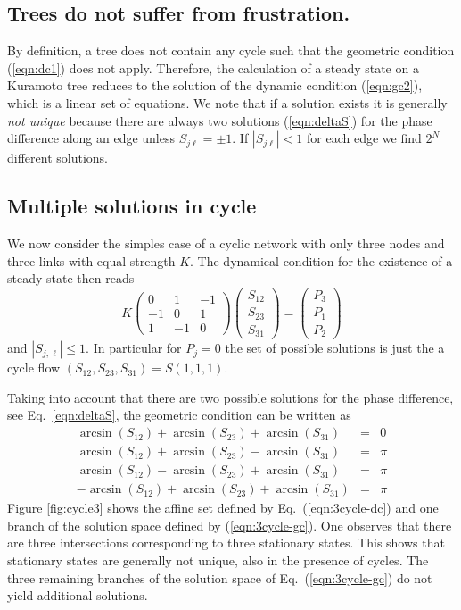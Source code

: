 \documentclass[10pt,aps,pra,twocolumn,superscriptaddress]{revtex4-1}
\newcommand{\be}{\begin{equation}}
\newcommand{\ee}{\end{equation}}
\newcommand{\bea}{\begin{eqnarray}}
\newcommand{\eea}{\end{eqnarray}}
\newcommand{\nn}{\nonumber}
\begin{document}
\subsection{Trees do not suffer from frustration.}

By definition, a tree does not contain any cycle such that
the geometric condition (\ref{eqn:dc1}) does not apply. 
Therefore, the calculation of a steady state on a Kuramoto 
tree reduces to the solution of the dynamic condition 
(\ref{eqn:gc2}), which is a linear set of equations.
We note that if a solution exists it is generally \emph{not unique}
because there are always two solutions  (\ref{eqn:deltaS}) 
for the phase difference along an edge unless $S_{j\ell} = \pm 1$.
If $|S_{j\ell}| < 1$ for each edge we find $2^N$ different 
solutions.


\subsection{Multiple solutions in cycle}

We now consider the simples case of a cyclic network with only 
three nodes and three links with equal strength $K$. The 
dynamical condition for the existence of a steady state then
reads
\be
   K \begin{pmatrix} 0 & 1 & -1 \\ -1 & 0 & 1 \\ 1 & -1 & 0   
   \end{pmatrix}
   \begin{pmatrix} S_{12} \\ S_{23} \\ S_{31} \end{pmatrix}
  = \begin{pmatrix} P_3 \\ P_1 \\ P_2 \end{pmatrix}
    \label{eqn:3cycle-dc} 
\ee
 and $|S_{j,\ell}| \le 1$. In particular for $P_j = 0$ the
set of possible solutions is just the a cycle flow 
$(S_{12}, S_{23}, S_{31}) = S (1,1,1)$.

Taking into account that there are two possible solutions for the
phase difference, see Eq.~\ref{eqn:deltaS}, the geometric condition
can be written as
\bea
      \arcsin(S_{12}) + \arcsin(S_{23}) +  \arcsin(S_{31}) &=& 0    \nn \\ 
      \arcsin(S_{12}) + \arcsin(S_{23})  -  \arcsin(S_{31}) &=& \pi \nn \\ 
      \arcsin(S_{12}) - \arcsin(S_{23})  + \arcsin(S_{31}) &=& \pi \nn \\ 
   - \arcsin(S_{12}) + \arcsin(S_{23})  +  \arcsin(S_{31}) &=& \pi  
   \label{eqn:3cycle-gc} 
\eea 
Figure \ref{fig:cycle3} shows the affine set defined by 
Eq.~(\ref{eqn:3cycle-dc})  and one branch of the solution
space defined by  (\ref{eqn:3cycle-gc}). One observes that 
there are three intersections corresponding to 
three stationary states. This shows that stationary
states are generally not unique, also in the presence
of cycles.
The three remaining branches of the solution space
of Eq.~(\ref{eqn:3cycle-gc}) do not yield additional
solutions.
\end{document}
